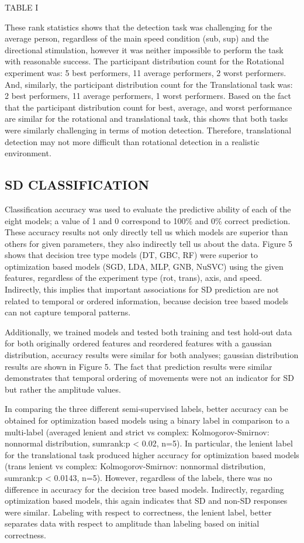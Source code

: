 \documentclass[11pt, onecolumn]{article}
\begin{document}
TABLE I

These rank statistics shows that the detection task was challenging for the average person, regardless of the main speed condition (sub, sup) and the directional stimulation, however it was neither impossible to perform the task with reasonable success.  The participant distribution count for the Rotational experiment was: 5 best performers, 11 average performers, 2 worst performers. And, similarly, the participant distribution count for the Translational task was: 2 best performers, 11 average performers, 1 worst performers.  Based on the fact that the participant distribution count for best, average, and worst performance are similar for the rotational and translational task, this shows that both tasks were similarly challenging in terms of motion detection.  Therefore, translational detection may not more difficult than rotational detection in a realistic environment.

\subsection{SD CLASSIFICATION}
Classification accuracy was used to evaluate the predictive ability of each of the eight models; a value of 1 and 0 correspond to 100\% and 0\% correct prediction.  These accuracy results not only directly tell us which models are superior than others for given parameters, they also indirectly tell us about the data.  Figure 5 shows that decision tree type models (DT, GBC, RF) were superior to optimization based models (SGD, LDA, MLP, GNB, NuSVC) using the given features, regardless of the experiment type (rot, trans), axis, and speed.  Indirectly, this implies that important associations for SD prediction are not related to temporal or ordered information, because decision tree based models can not capture temporal patterns.

Additionally, we trained models and tested both training and test hold-out data for both originally ordered features and reordered features with a gaussian distribution, accuracy results were similar for both analyses; gaussian distribution results are shown in Figure 5. The fact that prediction results were similar demonstrates that temporal ordering of movements were not an indicator for SD but rather the amplitude values. 

In comparing the three different semi-supervised labels, better accuracy can be obtained for optimization based models using a binary label in comparison to a multi-label (averaged lenient and strict vs complex:  Kolmogorov-Smirnov: nonnormal distribution, sumrank:p < 0.02, n=5).  In particular, the lenient label for the translational task produced higher accuracy for optimization based models (trans lenient vs complex: Kolmogorov-Smirnov: nonnormal distribution, sumrank:p < 0.0143, n=5).  However, regardless of the labels, there was no difference in accuracy for the decision tree based models. Indirectly, regarding optimization based models, this again indicates that SD and non-SD responses were similar.  Labeling with respect to correctness, the lenient label, better separates data with respect to amplitude than labeling based on initial correctness.
\end{document}
